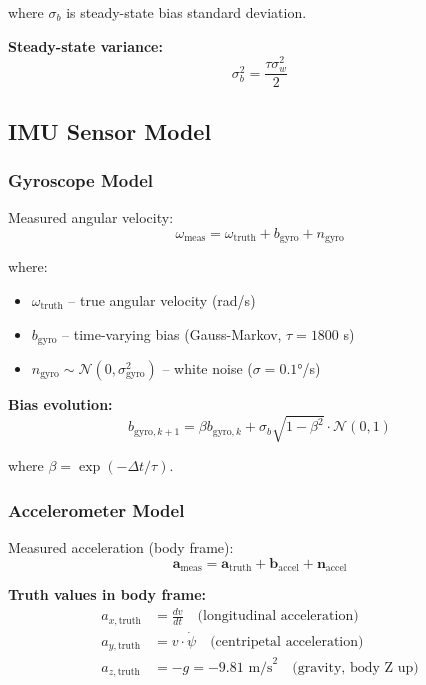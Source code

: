 \documentclass[11pt,a4paper]{article}
\begin{document}
where $\sigma_b$ is steady-state bias standard deviation.

\textbf{Steady-state variance:}
\begin{equation}
\sigma_b^2 = \frac{\tau \sigma_w^2}{2}
\end{equation}

\subsection{IMU Sensor Model}

\subsubsection{Gyroscope Model}

Measured angular velocity:
\begin{equation}
\omega_{\text{meas}} = \omega_{\text{truth}} + b_{\text{gyro}} + n_{\text{gyro}}
\end{equation}

where:
\begin{itemize}
    \item $\omega_{\text{truth}}$ -- true angular velocity (rad/s)
    \item $b_{\text{gyro}}$ -- time-varying bias (Gauss-Markov, $\tau = 1800$ s)
    \item $n_{\text{gyro}} \sim \mathcal{N}(0, \sigma_{\text{gyro}}^2)$ -- white noise ($\sigma = 0.1°$/s)
\end{itemize}

\textbf{Bias evolution:}
\begin{equation}
b_{\text{gyro},k+1} = \beta b_{\text{gyro},k} + \sigma_b \sqrt{1 - \beta^2} \cdot \mathcal{N}(0, 1)
\end{equation}

where $\beta = \exp(-\Delta t / \tau)$.

\subsubsection{Accelerometer Model}

Measured acceleration (body frame):
\begin{equation}
\mathbf{a}_{\text{meas}} = \mathbf{a}_{\text{truth}} + \mathbf{b}_{\text{accel}} + \mathbf{n}_{\text{accel}}
\end{equation}

\textbf{Truth values in body frame:}
\begin{align}
a_{x,\text{truth}} &= \frac{dv}{dt} \quad \text{(longitudinal acceleration)} \\
a_{y,\text{truth}} &= v \cdot \dot{\psi} \quad \text{(centripetal acceleration)} \\
a_{z,\text{truth}} &= -g = -9.81 \text{ m/s}^2 \quad \text{(gravity, body Z up)}
\end{align}
\end{document}
